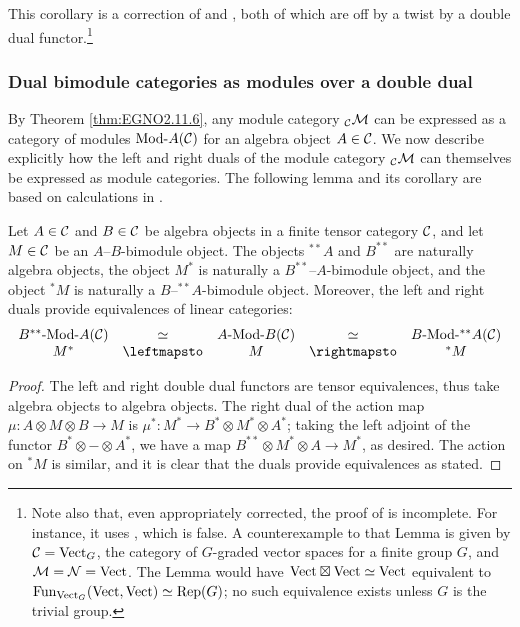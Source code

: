 \documentclass{amsart}
\begin{document}
\begin{remark} \label{rmk:Deligne_pdt_as_mod_functor}
This corollary is a correction of \cite[Remark 3.6]{0909.3140} and \cite[Thm. 3.20]{0911.4979}, both of which are off by a twist by a double dual functor.\footnote{Note also that, even appropriately corrected, the proof of \cite[Thm 3.20]{0911.4979} is incomplete.  For instance, it uses \cite[Lemma 3.21]{0911.4979}, which is false.  A counterexample to that Lemma is given by $\mathcal C = \mathrm{Vect}_G$, the category of $G$-graded vector spaces for a finite group $G$, and $\mathcal M = \mathcal N = \mathrm{Vect}$.  The Lemma would have $\mathrm{Vect} \boxtimes \mathrm{Vect} \simeq \mathrm{Vect}$ equivalent to $\operatorname{Fun}_{\mathrm{Vect}_G}(\mathrm{Vect},\mathrm{Vect}) \simeq \mathrm{Rep}(G)$; no such equivalence exists unless $G$ is the trivial group.} 
\end{remark} %


\subsubsection{Dual bimodule categories as modules over a double dual}

By Theorem \ref{thm:EGNO2.11.6}, any module category ${}_\mathcal C \mathcal M$ can be expressed as a category of modules $\Mod{}{A}(\cC)$ for an algebra object $A \in \mathcal C$.  We now describe explicitly how the left and right duals of the module category ${}_\mathcal C \mathcal M$ can themselves be expressed as module categories.  The following lemma and its corollary are based on calculations in \cite[\S 3]{MR2097289}.

\begin{lemma}\label{lem:dualing-amod}
Let $A \in \mathcal C$ and $B \in \mathcal C$ be algebra objects in a finite tensor category $\mathcal C$, and let $M \in \mathcal C$ be an $A$--$B$-bimodule object.  The objects ${}^{**} A$ and $B^{**}$ are naturally algebra objects, the object $M^*$ is naturally a $B^{**}$--$A$-bimodule object, and the object ${}^* M$ is naturally a $B$--${}^{**} A$-bimodule object.  Moreover, the left and right duals provide equivalences of linear categories:
\begin{equation*}
\begin{array}{ccccc}
	\Mod{B^{**}}{A}(\cC) &\simeq& \Mod{A}{B}(\cC) &\simeq& \Mod{B}{{}^{**}A}(\cC) \\
	M^* &\leftmapsto& M &\rightmapsto& {}^* M
\end{array}
\end{equation*}
\end{lemma}

\begin{proof}
The left and right double dual functors are tensor equivalences, thus take algebra objects to algebra objects.  The right dual of the action map $\mu: A \otimes M \otimes B \rightarrow M$ is $\mu^*: M^* \rightarrow B^* \otimes M^* \otimes A^*$; taking the left adjoint of the functor $B^* \otimes - \otimes A^*$, we have a map $B^{**} \otimes M^* \otimes A \rightarrow M^*$, as desired.  The action on ${}^* M$ is similar, and it is clear that the duals provide equivalences as stated.
\end{proof}
\end{document}
